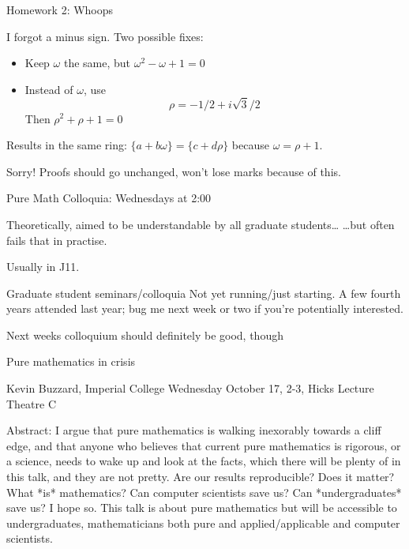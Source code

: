 \documentclass{beamer}
\begin{document}
\begin{frame}{Homework 2: Whoops}
  \begin{block}{I forgot a minus sign. Two possible fixes:}
    \begin{itemize}
      \item Keep $\omega$ the same, but $\omega^2-\omega+1=0$
      \item Instead of $\omega$, use $$\rho=-1/2+i\sqrt{3}/2 $$
        Then $\rho^2+\rho+1=0$
    \end{itemize}
        Results in the same ring: $\{a+b\omega\}=\{c+d\rho\}$ because $\omega=\rho+1$.

\end{block}    
  \begin{block}{Sorry!}
    Proofs should go unchanged, won't lose marks because of this.
  \end{block}
\end{frame}


\begin{frame}{Pure Math Colloquia: Wednesdays at 2:00}
  \begin{block}{Theoretically, aimed to be understandable by all graduate students\dots}
    \dots but often fails that in practise.
  \end{block}
  Usually in J11.
  \begin{block}{Graduate student seminars/colloquia}
Not yet running/just starting.  A few fourth years attended last year; bug me next week or two if you're potentially interested.
  \end{block}

  \begin{block}{Next weeks colloquium should definitely be good, though}
  \end{block}  
\end{frame}


\begin{frame}{Pure mathematics in crisis}
  \begin{block}{Kevin Buzzard, Imperial College} Wednesday October 17, 2-3, Hicks Lecture Theatre C
  \end{block}

  \begin{block}{Abstract:}
I argue that pure mathematics is walking inexorably towards a cliff edge, and that anyone who believes that current pure mathematics is rigorous, or a science, needs to wake up and look at the facts, which there will be plenty of in this talk, and they are not pretty. Are our results reproducible? Does it matter? What *is* mathematics? Can computer scientists save us? Can *undergraduates* save us? I hope so. This talk is about pure mathematics but will be accessible to undergraduates, mathematicians both pure and applied/applicable and computer scientists. \end{block}
\end{frame}
\end{document}
